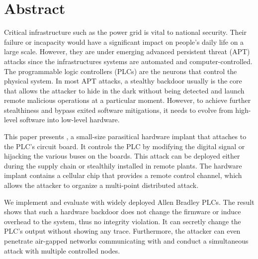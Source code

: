\section{Abstract}
\label{sec:implant-abstract}


Critical infrastructure such as the power grid is vital to national security.
Their failure or incapacity would have a significant impact on people's daily life on a large scale. However, they are under emerging advanced persistent threat (APT) attacks since the infrastructures systems are automated and computer-controlled. The programmable logic controllers (PLCs) are the neurons that control the physical system. In most APT attacks, a stealthy backdoor usually is the core that allows the attacker to hide in the dark without being detected and launch remote malicious operations at a particular moment. However, to achieve further stealthiness and bypass exited software mitigations, it needs to evolve from high-level software into low-level hardware.

This paper presents \name, a small-size parasitical hardware implant that attaches to the PLC's circuit board. It controls the PLC by modifying the digital signal or hijacking the various buses on the boards. This attack can be deployed either during the supply chain or stealthily installed in remote plants. The hardware implant contains a cellular chip that provides a remote control channel, which allows the attacker to organize a multi-point distributed attack.

We implement and evaluate \name with widely deployed Allen Bradley PLCs. The result shows that such a hardware backdoor does not change the firmware or induce overhead to the system, thus no integrity violation. It can secretly change the PLC's output without showing any trace. Furthermore, the attacker can even penetrate air-gapped networks communicating with \name and conduct a simultaneous attack with multiple controlled nodes.

